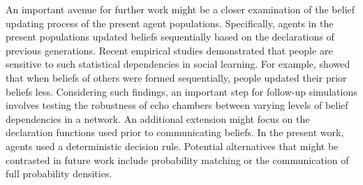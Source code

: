 \documentclass[fleqn,10pt]{wlscirep}
\begin{document}
An important avenue for further work might be a closer examination of the belief updating process of the present agent populations. Specifically, agents in the present populations updated beliefs sequentially based on the declarations of previous generations. Recent empirical studies demonstrated that people are sensitive to such statistical dependencies in social learning. For example, \cite{whalen2018sensitivity} showed that when beliefs of others were formed sequentially, people updated their prior beliefs less. Considering such findings, an important step for follow-up simulations involves testing the robustness of echo chambers between varying levels of belief dependencies in a network. An additional extension might focus on the declaration functions used prior to communicating beliefs. In the present work, agents used a deterministic decision rule. Potential alternatives that might be contrasted in future work include probability matching \cite{shanks2002re} or the communication of full probability densities.




\end{document}
